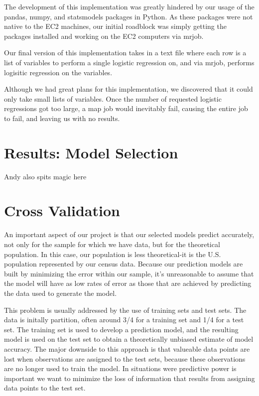 \documentclass[11pt]{article}
\begin{document}
The development of this implementation was greatly hindered by our usage of the pandas, numpy, and statsmodels packages in Python. As these packages were not native to the EC2 machines, our initial roadblock was simply getting the packages installed and working on the EC2 computers via mrjob.

Our final version of this implementation takes in a text file where each row is a list of variables to perform a single logistic regression on, and via mrjob, performs logisitic regression on the variables.

Although we had great plans for this implementation, we discovered that it could only take small lists of variables. Once the number of requested logistic regressions got too large, a map job would inevitably fail, causing the entire job to fail, and leaving us with no results.

\section{ Results: Model Selection}
Andy also spits magic here
\section{Cross Validation}
An important aspect of our project is that our selected models predict accurately, not only for the sample for which we have data, but for the theoretical population. In this case, our population is less theoretical-it is the U.S. population represented by our census data. Because our prediction models are built by minimizing the error within our sample, it's unreasonable to assume that the model will have as low rates of error as those that are achieved by predicting the data used to generate the model.


This problem is usually addressed by the use of training sets and test sets. The data is initally partition, often around 3/4 for a training set and 1/4 for a test set. The training set is used to develop a prediction model, and the resulting model is used on the test set to obtain a theoretically unbiased estimate of model accuracy. The major downside to this approach is that valueable data points are lost when observations are assigned to the test sets, because these observations are no longer used to train the model. In situations were predictive power is important we want to minimize the loss of information that results from assigning data points to the test set. 
\end{document}
